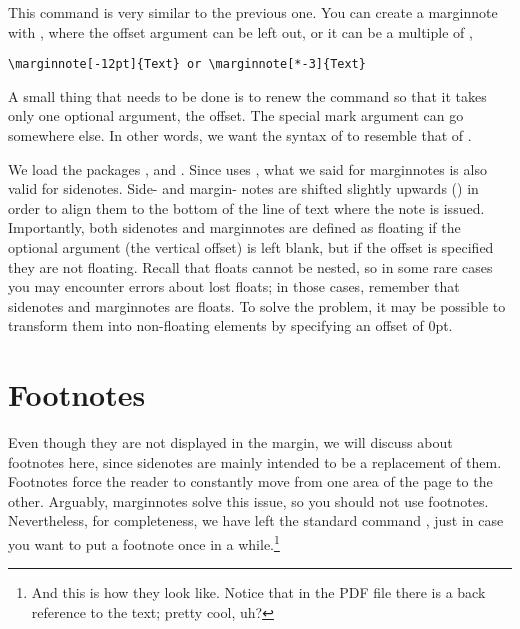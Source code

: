 This command is very similar to the previous one. You can create a 
marginnote with , where the offset 
argument can be left out, or it can be a multiple of 
, 
\eg

\begin{lstlisting}[style=kaolstplain]
\marginnote[-12pt]{Text} or \marginnote[*-3]{Text}
\end{lstlisting}

\begin{kaobox}[title=To Do]
A small thing that needs to be done is to renew the  
command so that it takes only one optional argument, the offset. The 
special mark argument can go somewhere else. In other words, we want the 
syntax of  to resemble that of .
\end{kaobox}

We load the packages ,  and 
. Since  uses , 
what we said for marginnotes is also valid for sidenotes. Side- and 
margin- notes are shifted slightly upwards 
() in 
order to align them to the bottom of the line of text where the note is 
issued. Importantly, both sidenotes and marginnotes are defined as 
floating if the optional argument (\ie the vertical offset) is left 
blank, but if the offset is specified they are not floating. Recall that 
floats cannot be nested, so in some rare cases you may encounter errors 
about lost floats; in those cases, remember that sidenotes and 
marginnotes are floats. To solve the problem, it may be possible to 
transform them into non-floating elements by specifying an offset of 
0pt.

\section{Footnotes}

Even though they are not displayed in the margin, we will discuss about 
footnotes here, since sidenotes are mainly intended to be a replacement 
of them. Footnotes force the reader to constantly move from one area of 
the page to the other. Arguably, marginnotes solve this issue, so you 
should not use footnotes. Nevertheless, for completeness, we have left 
the standard command , just in case you want to put a 
footnote once in a while.\footnote{And this is how they look like. 
Notice that in the PDF file there is a back reference to the text; 
pretty cool, uh?}

